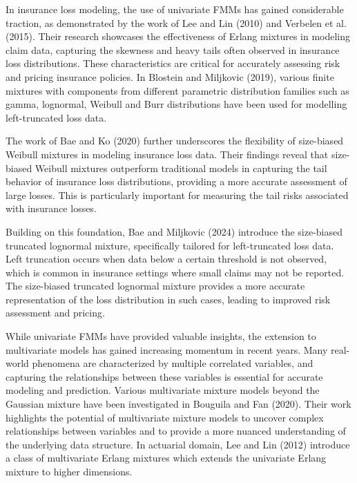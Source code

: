 \documentclass[11pt]{article}
\begin{document}
In insurance loss modeling, the use of univariate FMMs has gained considerable traction, as demonstrated by the work of Lee and Lin (2010)\nocite{leelin2010} and Verbelen et al. (2015)\nocite{Verbelen2015}. Their research showcases the effectiveness of Erlang mixtures in modeling claim data, capturing the skewness and heavy tails often observed in insurance loss distributions. These characteristics are critical for accurately assessing risk and pricing insurance policies. In Blostein and Miljkovic (2019)\nocite{blostein2019modeling}, various finite mixtures with components from different parametric distribution families such as gamma, lognormal, Weibull and Burr distributions have been used for modelling left-truncated loss data.       

The work of Bae and Ko (2020)\nocite{bae2020mixtures} further underscores the flexibility of size-biased Weibull mixtures in modeling insurance loss data. Their findings reveal that size-biased Weibull mixtures outperform traditional models in capturing the tail behavior of insurance loss distributions, providing a more accurate assessment of large losses.  This is particularly important for measuring the tail risks associated with insurance losses.

Building on this foundation, Bae and Miljkovic (2024)\nocite{bae2024loss} introduce the size-biased truncated lognormal mixture, specifically tailored for left-truncated loss data. Left truncation occurs when data below a certain threshold is not observed, which is common in insurance settings where small claims may not be reported. The size-biased truncated lognormal mixture provides a more accurate representation of the loss distribution in such cases, leading to improved risk assessment and pricing.

While univariate FMMs have provided valuable insights, the extension to multivariate models has gained increasing momentum in recent years. Many real-world phenomena are characterized by multiple correlated variables, and capturing the relationships between these variables is essential for accurate modeling and prediction. Various multivariate mixture models beyond the Gaussian mixture have been investigated in Bouguila and Fan (2020)\nocite{Bouguila2020}. Their work highlights the potential of multivariate mixture models to uncover complex relationships between variables and to provide a more nuanced understanding of the underlying data structure. In actuarial domain, Lee and Lin (2012)\nocite{leelin2012} introduce a class of multivariate Erlang mixtures which extends the univariate Erlang mixture to higher dimensions. 
\end{document}
